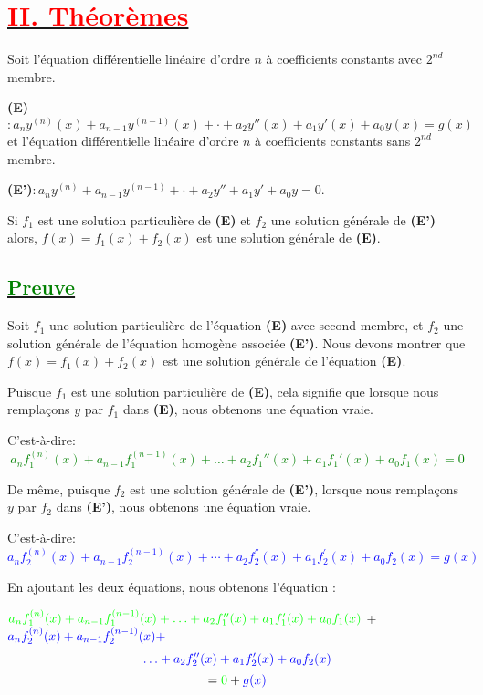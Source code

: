 \documentclass[12pt]{article}
\begin{document}
\section*{\underline{\textbf{\textcolor{red}{II. Théorèmes}}}}
Soit l'équation différentielle linéaire d'ordre $n$ à coefficients constants avec $2^{nd}$ membre.
 
\textbf{(E)}$:a_{n}y^{(n)}(x)+a_{n-1}y^{(n-1)}(x)+\cdot+a_{2}y''(x)+a_{1}y'(x)+a_{0}y(x)=g(x)$ et l'équation différentielle linéaire d'ordre $n$ à coefficients constants sans $2^{nd}$ membre.

\textbf{(E')}$:a_{n}y^{(n)}+a_{n-1}y^{(n-1)}+\cdot+a_{2}y''+a_{1}y'+a_{0}y=0$.

Si $f_{1}$ est une solution particulière de \textbf{(E)} et $f_{2}$ une solution générale de \textbf{(E')} alors, $f(x)=f_{1}(x)+f_{2}(x)$ est une solution générale de \textbf{(E)}.

\subsection*{\underline{\textbf{\textcolor{green}{Preuve}}}}
Soit $f_1$ une solution particulière de l'équation \textbf{(E)} avec second membre, et $f_2$ une solution générale de l'équation homogène associée \textbf{(E')}. Nous devons montrer que $f(x) = f_1(x) + f_2(x)$ est une solution générale de l'équation \textbf{(E)}.

Puisque $f_1$ est une solution particulière de \textbf{(E)}, cela signifie que lorsque nous remplaçons $y$ par $f_1$ dans \textbf{(E)}, nous obtenons une équation vraie. 

C'est-à-dire: \textcolor{green}{\[a_{n}f_1^{(n)}(x) + a_{n-1}f_1^{(n-1)}(x) + \ldots + a_{2}f_{1}''(x) + a_{1}f_{1}'(x) + a_{0}f_{1}(x)=0\]}

De même, puisque $f_2$ est une solution générale de \textbf{(E')}, lorsque nous remplaçons $y$ par $f_2$ dans \textbf{(E')}, nous obtenons une équation vraie.

C'est-à-dire: \textcolor{blue}{\[a_{n}f_{2}^{(n)}(x)+a_{n-1}f_{2}^{(n-1)}(x)+\cdots+a_{2}f_{2}^{''}(x)+a_{1}f_{2}^{'}(x)+a_{0}f_{2}(x)=g(x)\]}

En ajoutant les deux équations, nous obtenons l'équation :

$\textcolor{green}{a_{n}f_1^{(n)}(x) + a_{n-1}f_1^{(n-1)}(x) + \ldots + a_{2}f_{1}''(x) + a_{1}f_{1}'(x) + a_{0}f_{1}(x)}$ + $\textcolor{blue}{a_{n}f_2^{(n)}(x) + a_{n-1}f_2^{(n-1)}(x) +}$ 
\[\textcolor{blue}{\ldots + a_{2}f_{2}''(x) + a_{1}f_{2}'(x) + a_{0}f_{2}(x)}\]
\[=\textcolor{green}{0}+\textcolor{blue}{g(x)}\]
\end{document}
